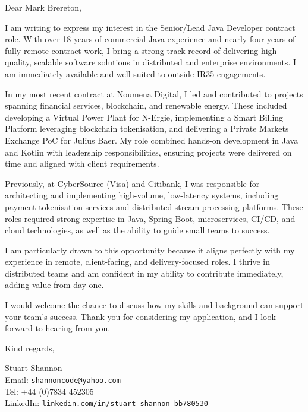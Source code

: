 \documentclass[a4paper,11pt]{letter}
\begin{document}
\begin{letter}{}
\opening{Dear Mark Brereton,}

I am writing to express my interest in the Senior/Lead Java Developer contract role. With over 18 years of commercial Java experience and nearly four years of fully remote contract work, I bring a strong track record of delivering high-quality, scalable software solutions in distributed and enterprise environments. I am immediately available and well-suited to outside IR35 engagements.

In my most recent contract at Noumena Digital, I led and contributed to projects spanning financial services, blockchain, and renewable energy. These included developing a Virtual Power Plant for N-Ergie, implementing a Smart Billing Platform leveraging blockchain tokenisation, and delivering a Private Markets Exchange PoC for Julius Baer. My role combined hands-on development in Java and Kotlin with leadership responsibilities, ensuring projects were delivered on time and aligned with client requirements.

Previously, at CyberSource (Visa) and Citibank, I was responsible for architecting and implementing high-volume, low-latency systems, including payment tokenisation services and distributed stream-processing platforms. These roles required strong expertise in Java, Spring Boot, microservices, CI/CD, and cloud technologies, as well as the ability to guide small teams to success.

I am particularly drawn to this opportunity because it aligns perfectly with my experience in remote, client-facing, and delivery-focused roles. I thrive in distributed teams and am confident in my ability to contribute immediately, adding value from day one.

I would welcome the chance to discuss how my skills and background can support your team’s success. Thank you for considering my application, and I look forward to hearing from you.

\closing{Kind regards,}

\signature{Stuart Shannon}
Stuart Shannon \\
Email: \texttt{shannoncode@yahoo.com} \\
Tel: +44 (0)7834 452305 \\
LinkedIn: \texttt{linkedin.com/in/stuart-shannon-bb780530}

\end{letter}
\end{document}
